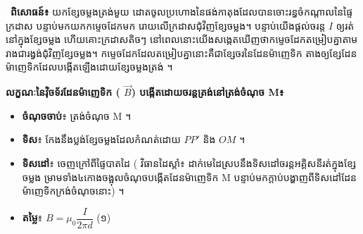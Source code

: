 
\noindent
\begin{minipage}[t]{0.55\textwidth}
\raggedright
\faChevronRight\ \textcolor{brownheader}{\textbf{ពិសោធន៍៖ }}
យកខ្សែចម្លងត្រង់មួយ
ដោតចូលប្រហោងនៃផង់កាតុងដែលបានចោះរន្ធចំកណ្តាលនៃផ្ទៃក្រដាស បន្ទាប់មកយកកម្ទេចដែកមក រោយលើក្រដាសជុំវិញខ្សែចម្លង។ បន្ទាប់យើងផ្តល់ចរន្ត $I$ ឲ្យរត់នៅក្នុងខ្សែចម្លង ហើយគោះក្រដាសតិចៗ នៅពេលនោះយើងសង្កេតឃើញថាកម្ទេចដែកតម្រៀបគ្នាតាមរាងជារង្វង់ជុំវិញខ្សែចម្លង។ កម្ទេចដែកដែលតម្រៀបគ្នានោះគឺជាខ្សែចរនៃដែនម៉ាញេទិក តាងឲ្យខ្សែដែនម៉ាញេទិកដែលបង្កើតឡើងដោយខ្សែចម្លងត្រង់ ។
\end{minipage}%
\hfill
\begin{minipage}[t]{0.40\textwidth}
	\vspace{0pt}
	\hspace*{0.5em}%
\end{minipage}

\vspace{1em}
\noindent
\begin{minipage}[t]{0.55\textwidth}
	\raggedright
	\textbf{លក្ខណៈនៃវ៉ិចទ័រដែនម៉ាញេទិក (
		$\vec{B}$) បង្កើតដោយចរន្តត្រង់នៅត្រង់ចំណុច M៖}

	\vspace{0.5em}
	\begin{itemize}[itemsep=4pt, topsep=2pt, parsep=0pt, leftmargin=1.6em]
	\item \textbf{ចំណុចចាប់}៖ ត្រង់ចំណុច M ។
	\item \textbf{ទិស}៖ កែងនឹងប្លង់ខ្សែចម្លងដែលកំណត់ដោយ $PP'$ និង $OM$ ។
	\item \textbf{ទិសដៅ}៖ ចេញក្រៅពីផ្ទៃបាតដៃ (
	វិធានដៃស្តាំ៖
	ដាក់មេដៃស្របនឹងទិសដៅចរន្តអគ្គិសនីរត់ក្នុងខ្សែចម្លង ម្រាមទាំង៤កោងចង្អុលចំណុចបង្កើតដែនម៉ាញេទិក M បន្ទាប់មកក្ដាប់បង្ហាញពីទិសដៅដែនម៉ាញេទិកក្រង់ចំណុចនោះ) ។
	\item \textbf{តម្លៃ}៖ $B = \mu_0 \dfrac{I}{2\pi d}$ \quad (១)
	\end{itemize}
	\vspace{0.5em}
\end{minipage}%
\hfill
\begin{minipage}[t]{0.40\textwidth}
	\vspace{0pt}
	\hspace*{0.5em}%
\end{minipage}

